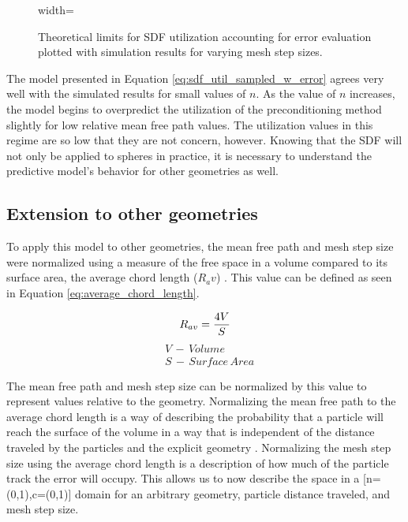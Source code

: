 \begin{figure}[H]
  \centering
  {width=\textwidth}
  \caption{Theoretical limits for SDF utilization accounting for error
    evaluation plotted with simulation results for varying mesh step sizes.}
  \label{fig:sdf_util_sampled_distance_w_error}
\end{figure}

The model presented in Equation \ref{eq:sdf_util_sampled_w_error} agrees very well
with the simulated results for small values of $n$. As the value of $n$
increases, the model begins to overpredict the utilization of the
preconditioning method slightly for low relative mean free path values. The
utilization values in this regime are so low that they are not concern,
however. Knowing that the SDF will not only be applied to spheres in practice,
it is necessary to understand the predictive model's behavior for other
geometries as well.

\subsection{Extension to other geometries}\label{subsec:sdf_other_geoms}

To apply this model to other geometries, the mean free path and mesh step size
were normalized using a measure of the free space in a volume compared to its
surface area, the average chord length ($R_av$) \cite{Wigner_1981}.  This value
can be defined as seen in Equation \ref{eq:average_chord_length}.

\begin{equation}
\centering
 R_{av} = \frac{4V}{S}
 \label{eq:average_chord_length}
\end{equation}
\begin{align*}
 &V \, - \, Volume \\
 &S \, - \, Surface \, Area
\end{align*}

The mean free path and mesh step size can be normalized by this value to
represent values relative to the geometry. Normalizing the mean free path to the
average chord length is a way of describing the probability that a particle will
reach the surface of the volume in a way that is independent of the distance
traveled by the particles and the explicit geometry
\cite{Mazzolo_2014}. Normalizing the mesh step size using the average chord
length is a description of how much of the particle track the error will
occupy. This allows us to now describe the space in a [n=(0,1),c=(0,1)] domain
for an arbitrary geometry, particle distance traveled, and mesh step size.


